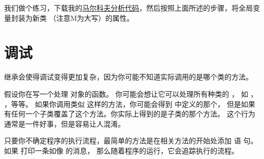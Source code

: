 
我们做个练习，下载我的\href{http://thinkpython2.com/code/markov.py}{马尔科夫分析代码}，然后按照上面所述的步骤，将全局变量封装为新类  （注意M为大写）的属性。


\section{调试}


继承会使得调试变得更加复杂，因为你可能不知道实际调用的是哪个类的方法。



假设你在写一个处理  对象的函数。  
你可能会想让它可以处理所有种类的  ，
如  ，  ，等等。  
如果你调用类似  这样的方法，你可能会得到  中定义的那个，
但是如果有任何一个子类覆盖了这个方法。你实际上得到的是子类的那个方法。  
这个行为通常是一件好事，但是容易让人混淆。


只要你不确定程序的执行流程，最简单的方法是在相关方法的开始处添加  语
句。  如果  打印一条如像  的消息，
那么随着程序的运行，它会追踪执行的流程。

